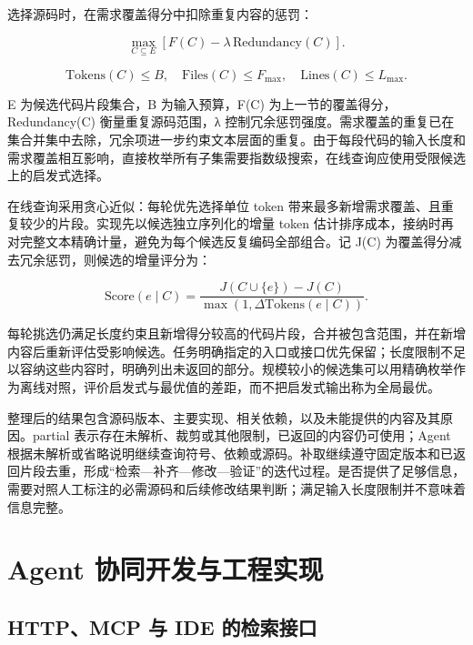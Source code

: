 选择源码时，在需求覆盖得分中扣除重复内容的惩罚：

\begin{equation}
\max_{C\subseteq E}\left[F(C)-\lambda\,\mathrm{Redundancy}(C)\right].
\end{equation}

\begin{equation}
\mathrm{Tokens}(C)\leq B,\quad \mathrm{Files}(C)\leq F_{\max},\quad \mathrm{Lines}(C)\leq L_{\max}.
\end{equation}

E 为候选代码片段集合，B 为输入预算，F(C) 为上一节的覆盖得分，Redundancy(C) 衡量重复源码范围，λ 控制冗余惩罚强度。需求覆盖的重复已在集合并集中去除，冗余项进一步约束文本层面的重复。由于每段代码的输入长度和需求覆盖相互影响，直接枚举所有子集需要指数级搜索，在线查询应使用受限候选上的启发式选择。

在线查询采用贪心近似：每轮优先选择单位 token 带来最多新增需求覆盖、且重复较少的片段。实现先以候选独立序列化的增量 token 估计排序成本，接纳时再对完整文本精确计量，避免为每个候选反复编码全部组合。记 J(C) 为覆盖得分减去冗余惩罚，则候选的增量评分为：

\begin{equation}
\mathrm{Score}(e\mid C)=\frac{J(C\cup\{e\})-J(C)}{\max\left(1,\Delta\mathrm{Tokens}(e\mid C)\right)}.
\end{equation}

每轮挑选仍满足长度约束且新增得分较高的代码片段，合并被包含范围，并在新增内容后重新评估受影响候选。任务明确指定的入口或接口优先保留；长度限制不足以容纳这些内容时，明确列出未返回的部分。规模较小的候选集可以用精确枚举作为离线对照，评价启发式与最优值的差距，而不把启发式输出称为全局最优。

整理后的结果包含源码版本、主要实现、相关依赖，以及未能提供的内容及其原因。partial 表示存在未解析、裁剪或其他限制，已返回的内容仍可使用；Agent 根据未解析或省略说明继续查询符号、依赖或源码。补取继续遵守固定版本和已返回片段去重，形成“检索—补齐—修改—验证”的迭代过程。是否提供了足够信息，需要对照人工标注的必需源码和后续修改结果判断；满足输入长度限制并不意味着信息完整。

\chapter{Agent 协同开发与工程实现}
\label{chap:implementation}

\section{HTTP、MCP 与 IDE 的检索接口}

